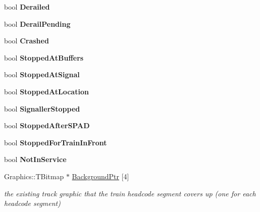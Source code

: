 \begin{DoxyCompactItemize}
bool {\bfseries Derailed}
\item 
\mbox{\label{class_t_train_aabb977acb12c9cd6cd527faed9637830}} 
bool {\bfseries Derail\+Pending}
\item 
\mbox{\label{class_t_train_acee5980b53db6ad43e7b5225ad354457}} 
bool {\bfseries Crashed}
\item 
\mbox{\label{class_t_train_a9a549bcd3e8c0d24701399349bc3acc9}} 
bool {\bfseries Stopped\+At\+Buffers}
\item 
\mbox{\label{class_t_train_a444b07eb854c9af80adce5afbb207307}} 
bool {\bfseries Stopped\+At\+Signal}
\item 
\mbox{\label{class_t_train_a89642a602f382d5b58a7f5c0473f786f}} 
bool {\bfseries Stopped\+At\+Location}
\item 
\mbox{\label{class_t_train_ab04bbcf731ecc52b6549604d87101f63}} 
bool {\bfseries Signaller\+Stopped}
\item 
\mbox{\label{class_t_train_a9a333bca3d60db7670500574467ad7da}} 
bool {\bfseries Stopped\+After\+S\+P\+AD}
\item 
\mbox{\label{class_t_train_ae76e8f47258c0915f7f81e3b6596453c}} 
bool {\bfseries Stopped\+For\+Train\+In\+Front}
\item 
\mbox{\label{class_t_train_a92fca7c6fa30d8a5d5847b74e51e62cc}} 
bool {\bfseries Not\+In\+Service}
\item 
\mbox{\label{class_t_train_aaa4e520024a9e4c86e8754bb3c7cac2c}} 
Graphics\+::\+T\+Bitmap $\ast$ \mbox{\hyperlink{class_t_train_aaa4e520024a9e4c86e8754bb3c7cac2c}{Background\+Ptr}} \mbox{[}4\mbox{]}
\begin{DoxyCompactList}\small\item\em the existing track graphic that the train headcode segment covers up (one for each headcode segment) \end{DoxyCompactList}\item 
\mbox{\label{class_t_train_a4ee3cdc7a3602f92a96084f8818b9bd3}} 

\end{DoxyCompactItemize}
